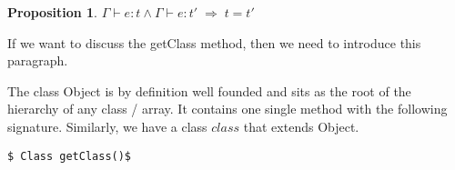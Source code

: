 \documentclass[a4paper, 11pt, english]{article}
\newtheorem*{prop}{Proposition}
\begin{document}
\begin{prop}
$\Gamma \vdash e: t \wedge \Gamma \vdash e: t' \; \Rightarrow \; t=t'$
\end{prop}


If we want to discuss the getClass method, then we need to introduce this paragraph.


The class Object is by definition well founded and sits as the root of the hierarchy of any class / array. It contains one single method with the following signature.
Similarly, we have a class $class$ that extends Object.

\begin{lstlisting}
$ Class getClass()$
\end{lstlisting}




\newcommand{\field}{\mathsf{f}}
\newcommand{\getter}{\mathsf{getF}}
\newcommand{\setter}{\mathsf{setF}}
\newcommand{\getField}{\mathsf{getField}}
\newcommand{\fieldBis}{\mathsf{f}'}
\newcommand{\setField}{\mathsf{setField}}
\newcommand{\heap}{H}
\newcommand{\A}{\mathbf{A}}
\newcommand{\Value}{\mathcal{V}}
\newcommand{\Objects}{\mathrm{Objects}}
\newcommand{\Ob}{\mathcal{O}}
\end{document}
